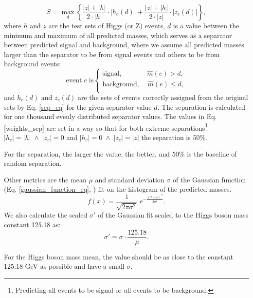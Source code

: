 \documentclass{ctuthesis}
\begin{document}
\begin{equation}
    S = \max_{d} \left\{\frac{|z|+|h|}{2\cdot |h|}\cdot |h_{c}(d)| + \frac{|z|+|h|}{2\cdot |z|}\cdot |z_{c}(d)|\right\},
\label{weights_sep}
\end{equation}
where $h$ and $z$ are the test sets of Higgs (or Z) events, $d$ is a value between the minimum and maximum of all predicted masses, which serves as a separator between predicted signal and background, where we assume all predicted masses larger than the separator to be from signal events and others to be from background events:
\begin{equation}
    \text{event} \;e \; \text{is} \left\{
    \begin{array}{ll}
          \text{signal}, \;\;\;\;\;\;\;\;\;\;\;\;\;       \hat{m}(e) > d,\\
          \text{background}, \;\;\;\;   \hat{m}(e) \leq d,\\
    \end{array} 
    \right.
\label{sep_eq}
\end{equation}
and $h_{c}(d)$ and $z_{c}(d)$ are the sets of events correctly assigned from the original sets by Eq. \ref{sep_eq} for the given separator value $d$. The separation is calculated for one thousand evenly distributed separator values. The values in Eq. \ref{weights_sep} are set in a way so that for both extreme separations\footnote{Predicting all events to be signal or all events to be background.} $|h_c| = |h| \; \wedge \; |z_c| = 0$ and $|h_c| = 0 \; \wedge \; |z_c| = |z|$ the separation is 50\%.

For the separation, the larger the value, the better, and $50\%$ is the baseline of random separation.

Other metrics are the mean $\mu$ and standard deviation $\sigma$ of the Gaussian function (Eq. \ref{gaussian_function_eq}, \cite{gaussian_functino}) fit on the histogram of the predicted masses.
\begin{equation}
\label{gaussian_function_eq}
    f(x) = \frac{1}{\sqrt{2\pi\sigma^2}}\;e^{-\frac{(x-\mu)^2}{2\sigma^2}}.
\end{equation}
We also calculate the scaled $\sigma'$ of the Gaussian fit scaled to the Higgs boson mass constant 125.18 as:
\begin{equation}
    \sigma' = \sigma \cdot \frac{125.18}{\mu}.
\label{eq:scaled_sigma}
\end{equation}

For the Higgs boson mass mean, the value should be as close to the constant 125.18 GeV as possible and have a small $\sigma$.
\end{document}
